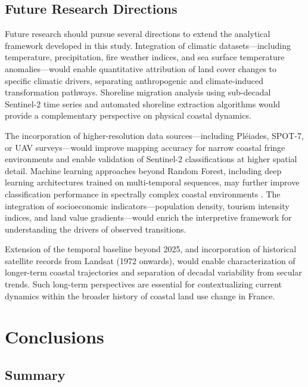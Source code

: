 \documentclass[coasts,article,accept,pdftex,moreauthors]{Definitions/mdpi}
\begin{document}
\subsection{Future Research Directions}

Future research should pursue several directions to extend the analytical framework developed in this study. Integration of climatic datasets—including temperature, precipitation, fire weather indices, and sea surface temperature anomalies—would enable quantitative attribution of land cover changes to specific climatic drivers, separating anthropogenic and climate-induced transformation pathways. Shoreline migration analysis using sub-decadal Sentinel-2 time series and automated shoreline extraction algorithms would provide a complementary perspective on physical coastal dynamics.

The incorporation of higher-resolution data sources—including Pléiades, SPOT-7, or UAV surveys—would improve mapping accuracy for narrow coastal fringe environments and enable validation of Sentinel-2 classifications at higher spatial detail. Machine learning approaches beyond Random Forest, including deep learning architectures trained on multi-temporal sequences, may further improve classification performance in spectrally complex coastal environments \citep{w16081141}. The integration of socioeconomic indicators—population density, tourism intensity indices, and land value gradients—would enrich the interpretive framework for understanding the drivers of observed transitions.

Extension of the temporal baseline beyond 2025, and incorporation of historical satellite records from Landsat (1972 onwards), would enable characterization of longer-term coastal trajectories and separation of decadal variability from secular trends. Such long-term perspectives are essential for contextualizing current dynamics within the broader history of coastal land use change in France.

\section{Conclusions}

\subsection{Summary}
\end{document}
